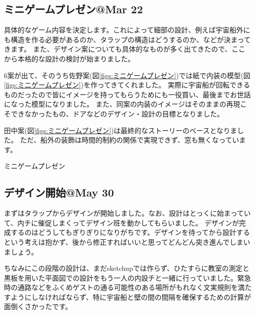 \documentclass[uplatex,dvipdfmx]{jsarticle}
\begin{document}
\subsection{ミニゲームプレゼン@Mar 22}

具体的なゲーム内容を決定します。これによって細部の設計、例えば宇宙船外にも構造を作る必要があるのか、タラップの構造はどうするのか、などが決まってきます。
また、デザイン案についても具体的なものが多く出てきたので、ここから本格的な設計の検討が始まりました。

6案が出て、そのうち佐野案(図\ref{figs:ミニゲームプレゼン})では紙で内装の模型(図\ref{figs:ミニゲームプレゼン})を作ってきてくれました。
実際に宇宙船が回転できるものだったので皆にイメージを持ってもらうためにも一役買い、最後までお世話になった模型になりました。
また、同案の内装のイメージはそのままの再現こそできなかったもの、ドアなどのデザイン・設計の目標となりました。

田中案(図\ref{figs:ミニゲームプレゼン})は最終的なストーリーのベースとなりました。
ただ、船外の装飾は時間的制約の関係で実現できず、窓も無くなっています。

\begin{imageHere}{ミニゲームプレゼン}
    \vspace{-35mm}
\end{imageHere}

\clearpage

\subsection{デザイン開始@May 30}
まずはタラップからデザインが開始しました。なお、設計はとっくに始まっていて、内チに催促しまくってデザイン班を動かしてもらいました。
デザインが完成するのはどうしてもぎりぎりになりがちです。デザインを待ってから設計するという考えは抱かず、後から修正すればいいと思ってどんどん突き進んでしまいましょう。

ちなみにこの段階の設計は、まだsketchupでは作らず、ひたすらに教室の測定と黒板を用いた平面図での設計をもう一人の内設チと一緒に行っていました。緊急時の通路などをふくめゲストの通る可能性のある場所がもれなく文実規則を満たすようにしなければならず、特に宇宙船と壁の間の間隔を確保するための計算が面倒くさかったです。
\end{document}
